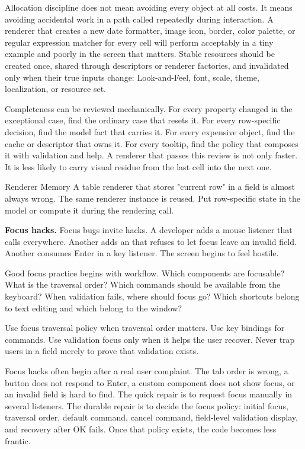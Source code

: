 Allocation discipline does not mean avoiding every object at all costs. It
means avoiding accidental work in a path called repeatedly during interaction.
A renderer that creates a new date formatter, image icon, border, color palette,
or regular expression matcher for every cell will perform acceptably in a tiny
example and poorly in the screen that matters. Stable resources should be
created once, shared through descriptors or renderer factories, and invalidated
only when their true inputs change: Look-and-Feel, font, scale, theme,
localization, or resource set.

Completeness can be reviewed mechanically. For every property changed in the
exceptional case, find the ordinary case that resets it. For every row-specific
decision, find the model fact that carries it. For every expensive object, find
the cache or descriptor that owns it. For every tooltip, find the policy that
composes it with validation and help. A renderer that passes this review is not
only faster. It is less likely to carry visual residue from the last cell into
the next one.

\begin{pitfallbox}{Renderer Memory}
A table renderer that stores "current row" in a field is almost always wrong. The same renderer instance is reused. Put row-specific state in the model or compute it during the rendering call.
\end{pitfallbox}

\textbf{Focus hacks.}
Focus bugs invite hacks. A developer adds a mouse listener that calls  everywhere. Another adds an  that refuses to let focus leave an invalid field. Another consumes Enter in a key listener. The screen begins to feel hostile.

Good focus practice begins with workflow. Which components are focusable? What is the traversal order? Which commands should be available from the keyboard? When validation fails, where should focus go? Which shortcuts belong to text editing and which belong to the window?

Use focus traversal policy when traversal order matters. Use key bindings for commands. Use validation focus only when it helps the user recover. Never trap users in a field merely to prove that validation exists.

Focus hacks often begin after a real user complaint. The tab order is wrong, a
button does not respond to Enter, a custom component does not show focus, or an
invalid field is hard to find. The quick repair is to request focus manually in
several listeners. The durable repair is to decide the focus policy: initial
focus, traversal order, default command, cancel command, field-level validation
display, and recovery after OK fails. Once that policy exists, the code becomes
less frantic.

